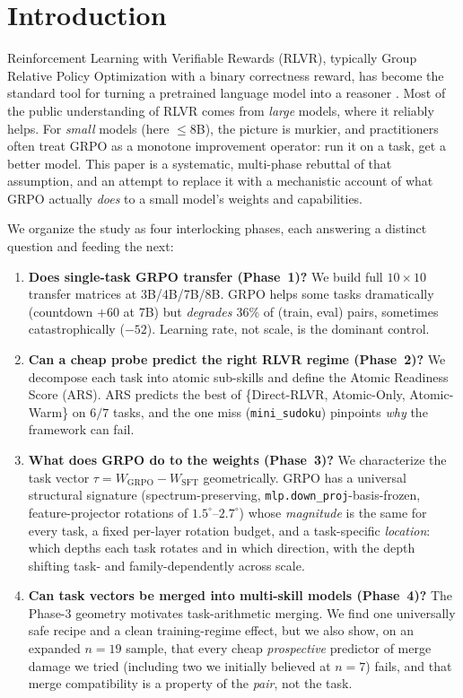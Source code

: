 \documentclass{article}
\newcommand{\Wsft}{W_{\mathrm{SFT}}}
\newcommand{\Wg}{W_{\mathrm{GRPO}}}
\newcommand{\dg}{^{\circ}}
\begin{document}
\section{Introduction}
Reinforcement Learning with Verifiable Rewards (RLVR), typically Group Relative Policy
Optimization \citep{shao2024deepseekmath} with a binary correctness reward, has become the
standard tool for turning a pretrained language model into a reasoner
\citep{deepseekai2025r1}. Most of the public understanding of RLVR comes from \emph{large}
models, where it reliably helps. For \emph{small} models (here $\leq 8$B), the picture is
murkier, and practitioners often treat GRPO as a monotone improvement operator: run it on a
task, get a better model. This paper is a systematic, multi-phase rebuttal of that assumption,
and an attempt to replace it with a mechanistic account of what GRPO actually \emph{does} to a
small model's weights and capabilities.

We organize the study as four interlocking phases, each answering a distinct question and
feeding the next:

\begin{enumerate}
\item \textbf{Does single-task GRPO transfer (Phase~1)?} We build full $10\times10$ transfer
matrices at 3B/4B/7B/8B. GRPO helps some tasks dramatically (countdown $+60$ at 7B) but
\emph{degrades $36\%$} of (train, eval) pairs, sometimes catastrophically ($-52$).
Learning rate, not scale, is the dominant control.
\item \textbf{Can a cheap probe predict the right RLVR regime (Phase~2)?} We decompose each
task into atomic sub-skills and define the Atomic Readiness Score (ARS). ARS predicts the
best of \{Direct-RLVR, Atomic-Only, Atomic-Warm\} on $6/7$ tasks, and the one miss
(\texttt{mini\_sudoku}) pinpoints \emph{why} the framework can fail.
\item \textbf{What does GRPO do to the weights (Phase~3)?} We characterize the task vector
$\tau=\Wg-\Wsft$ geometrically. GRPO has a universal structural signature (spectrum-preserving,
\texttt{mlp.down\_proj}-basis-frozen, feature-projector rotations of $1.5\dg$--$2.7\dg$) whose
\emph{magnitude} is the same for every task, a fixed per-layer rotation budget, and a task-specific
\emph{location}: which depths each task rotates and in which direction, with the depth shifting
task- and family-dependently across scale.
\item \textbf{Can task vectors be merged into multi-skill models (Phase~4)?} The Phase-3
geometry motivates task-arithmetic merging. We find one universally safe recipe and a clean
training-regime effect, but we also show, on an expanded $n{=}19$ sample, that every cheap
\emph{prospective} predictor of merge damage we tried (including two we initially believed at
$n{=}7$) fails, and that merge compatibility is a property of the \emph{pair}, not the task.
\end{enumerate}
\end{document}
